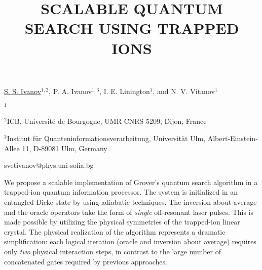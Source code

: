 \title{SCALABLE QUANTUM SEARCH USING TRAPPED IONS}

\underline{S. S. Ivanov}$^{1,2}$, P. A. Ivanov$^{1,3}$, I. E. Linington$^{1}$, and N. V. Vitanov$^{1}$  

{\normalsize{
\vspace{-4mm} $^1$\unisofia

\vspace{-4mm} $^2$ICB, Universit\'{e} de Bourgogne, UMR CNRS 5209, Dijon, France

\vspace{-4mm} $^3$Institut f\"{u}r Quanteninformationsverarbeitung, Universit\"{a}t Ulm, Albert-Einstein-Allee 11, D-89081 Ulm, Germany

\email svetivanov@phys.uni-sofia.bg}}

We propose a scalable implementation of Grover's quantum search algorithm in a trapped-ion quantum information processor.
The system is initialized in an entangled Dicke state by using adiabatic techniques.
The inversion-about-average and the oracle operators take the form of \emph{single} off-resonant laser pulses.
This is made possible by utilizing the physical symmetries of the trapped-ion linear crystal.
The physical realization of the algorithm represents a dramatic simplification:
each logical iteration (oracle and inversion about average) requires only \emph{two} physical interaction steps,
in contrast to the large number of concatenated gates required by previous approaches.

\vspace{\baselineskip} 